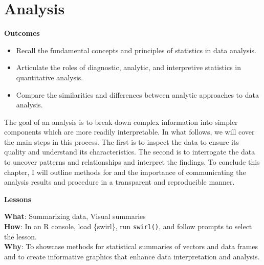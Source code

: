 \documentclass[
  letterpaper,
  krantz1]{latex/krantz-mod}
\providecommand{\tightlist}{%
  \setlength{\itemsep}{0pt}\setlength{\parskip}{0pt}}\usepackage{longtable,booktabs,array}
\newcommand{\setDOI}[1]{%
  \gdef\doi{%
    \footnotesize%
    #1\par%
    This chapter has been made available under a CC-BY-NC-ND license.%
  }%
}
\theoremstyle{definition}
\theoremstyle{definition}
\theoremstyle{remark}
\begin{document}
\chapter{Analysis}\label{sec-analysis-chapter}

\setDOI{10.4324/9781003393764.3}
\thispagestyle{chapterfirstpage}

\begin{tcolorbox}[enhanced jigsaw, toprule=.15mm, breakable, colback=white, arc=.35mm, left=2mm, colframe=quarto-callout-color-frame, opacityback=0, bottomrule=.15mm, rightrule=.15mm, leftrule=.75mm]

\textbf{ Outcomes}

\begin{itemize}
\tightlist
\item
  Recall the fundamental concepts and principles of statistics in data
  analysis.
\item
  Articulate the roles of diagnostic, analytic, and interpretive
  statistics in quantitative analysis.
\item
  Compare the similarities and differences between analytic approaches
  to data analysis.
\end{itemize}

\end{tcolorbox}

The goal of an analysis is to break down complex information into
simpler components which are more readily interpretable. In what
follows, we will cover the main steps in this process. The first is to
inspect the data to ensure its quality and understand its
characteristics. The second is to interrogate the data to uncover
patterns and relationships and interpret the findings. To conclude this
chapter, I will outline methods for and the importance of communicating
the analysis results and procedure in a transparent and reproducible
manner.

\begin{tcolorbox}[enhanced jigsaw, toprule=.15mm, breakable, colback=white, arc=.35mm, left=2mm, colframe=quarto-callout-color-frame, opacityback=0, bottomrule=.15mm, rightrule=.15mm, leftrule=.75mm]

\textbf{ Lessons}

\textbf{What}: Summarizing data, Visual summaries\\
\textbf{How}: In an R console, load \{swirl\}, run \texttt{swirl()}, and
follow prompts to select the lesson.\\
\textbf{Why}: To showcase methods for statistical summaries of vectors
and data frames and to create informative graphics that enhance data
interpretation and analysis.

\end{tcolorbox}
\end{document}
